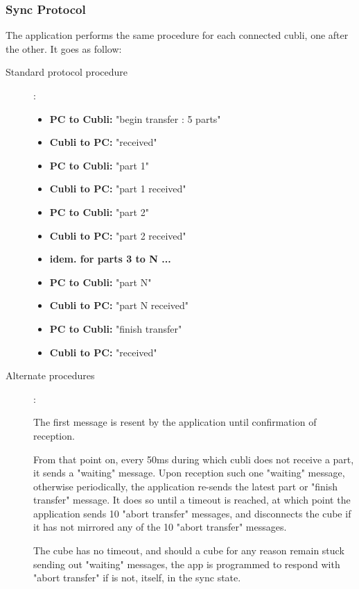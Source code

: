 \subsubsection{Sync Protocol}

The application performs the same procedure for each connected cubli, one after the other. It goes as follow:

\begin{description}
\item[Standard protocol procedure]:

\begin{itemize}
\item[] \textbf{PC to Cubli:} "begin transfer : 5 parts"
\item[] \textbf{Cubli to PC:} "received"
\item[] \textbf{PC to Cubli:} "part 1"
\item[] \textbf{Cubli to PC:} "part 1 received"
\item[] \textbf{PC to Cubli:} "part 2"
\item[] \textbf{Cubli to PC:} "part 2 received"
\item[] \textbf{idem. for parts 3 to N ...}
\item[] \textbf{PC to Cubli:} "part N"
\item[] \textbf{Cubli to PC:} "part N received"
\item[] \textbf{PC to Cubli:} "finish transfer"
\item[] \textbf{Cubli to PC:} "received"
\end{itemize}

\item[Alternate procedures]:

The first message is resent by the application until confirmation of reception.

From that point on, every 50ms during which cubli does not receive a part, it sends a "waiting" message. 
Upon reception such one "waiting" message, otherwise periodically, the application re-sends the latest part or "finish transfer" message. It does so until a timeout is reached, at which point the application sends 10 "abort transfer" messages, and disconnects the cube if it has not mirrored any of the 10 "abort transfer" messages.

The cube has no timeout, and should a cube for any reason remain stuck sending out "waiting" messages, the app is programmed to respond with "abort transfer" if is not, itself, in the sync state.

\end{description}

